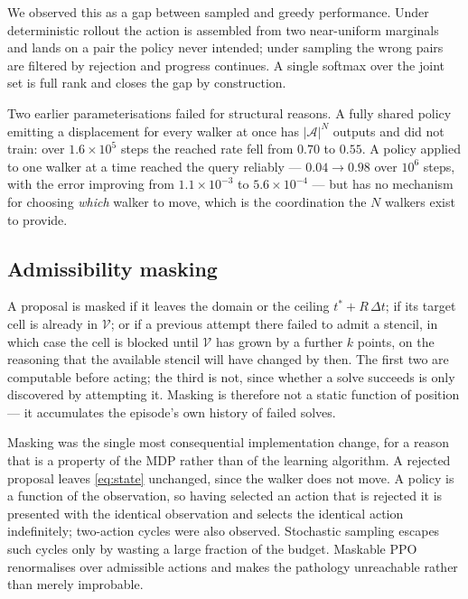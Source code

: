We observed this as a gap between sampled and greedy performance. Under
deterministic rollout the action is assembled from two near-uniform marginals
and lands on a pair the policy never intended; under sampling the wrong pairs
are filtered by rejection and progress continues. A single softmax over the
joint set is full rank and closes the gap by construction.

Two earlier parameterisations failed for structural reasons. A fully shared
policy emitting a displacement for every walker at once has
$|\mathcal{A}|^{N}$ outputs and did not train: over $1.6\times10^{5}$ steps the
reached rate fell from $0.70$ to $0.55$. A policy applied to one walker at a
time reached the query reliably --- $0.04 \to 0.98$ over $10^{6}$ steps, with
the error improving from $1.1\times10^{-3}$ to $5.6\times10^{-4}$ --- but has
no mechanism for choosing \emph{which} walker to move, which is the
coordination the $N$ walkers exist to provide.

\subsection{Admissibility masking}
\label{sec:mdp_mask}

A proposal is masked if it leaves the domain or the ceiling
$t^{*} + R\,\Delta t$; if its target cell is already in $\mathcal{V}$; or if a
previous attempt there failed to admit a stencil, in which case the cell is
blocked until $\mathcal{V}$ has grown by a further $k$ points, on the reasoning
that the available stencil will have changed by then. The first two are
computable before acting; the third is not, since whether a solve succeeds is
only discovered by attempting it. Masking is therefore not a static function of
position --- it accumulates the episode's own history of failed solves.

Masking was the single most consequential implementation change, for a reason
that is a property of the MDP rather than of the learning algorithm. A rejected
proposal leaves \eqref{eq:state} unchanged, since the walker does not move. A
policy is a function of the observation, so having selected an action that is
rejected it is presented with the identical observation and selects the
identical action indefinitely; two-action cycles were also observed. Stochastic
sampling escapes such cycles only by wasting a large fraction of the budget.
Maskable PPO~\cite{huang2022masking} renormalises over admissible actions and
makes the pathology unreachable rather than merely improbable.

